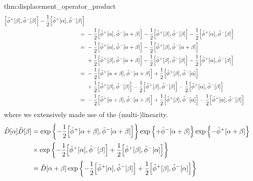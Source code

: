 \begin{delayedproof}{thm:displacement_operator_product}
\begin{equation*}
\begin{split}
			\comm{\hat\phi^+[\beta]}{\hat\phi^-[\beta]}
			-
			\frac{1}{2}
			\comm{\hat\phi^+[\alpha]}{\hat\phi^-[\beta]}
			\\
			=&\
			-
			\frac{1}{2}
			\comm{\hat\phi^+[\alpha]}{\hat\phi^-[\alpha+\beta]}
			-
			\frac{1}{2}
			\comm{\hat\phi^+[\beta]}{\hat\phi^-[\beta]}
			-
			\frac{1}{2}
			\comm{\hat\phi^+[\alpha]}{\hat\phi^-[\beta]}
			\\
			=&\
			-
			\frac{1}{2}
			\comm{\hat\phi^+[\alpha]}{\hat\phi^-[\alpha+\beta]}
			-
			\frac{1}{2}
			\comm{\hat\phi^+[\beta]}{\hat\phi^-[\alpha+\beta]}
			\\
			&\
			+
			\frac{1}{2}
			\comm{\hat\phi^+[\beta]}{\hat\phi^-[\alpha+\beta]}
			-
			\frac{1}{2}
			\comm{\hat\phi^+[\beta]}{\hat\phi^-[\beta]}
			-
			\frac{1}{2}
			\comm{\hat\phi^+[\alpha]}{\hat\phi^-[\beta]}
			\\
			=&\
			-
			\frac{1}{2}
			\comm{\hat\phi^+[\alpha+\beta]}{\hat\phi^-[\alpha+\beta]}
			+
			\frac{1}{2}
			\comm{\hat\phi^+[\beta]}{\hat\phi^-[\alpha]}
			\\
			&\
			+
			\frac{1}{2}
			\comm{\hat\phi^+[\beta]}{\hat\phi^-[\beta]}
			-
			\frac{1}{2}
			\comm{\hat\phi^+[\beta]}{\hat\phi^-[\beta]}
			-
			\frac{1}{2}
			\comm{\hat\phi^+[\alpha]}{\hat\phi^-[\beta]}
			\\
			=&\
			-
			\frac{1}{2}
			\comm{\hat\phi^+[\alpha+\beta]}{\hat\phi^-[\alpha+\beta]}
			+
			\frac{1}{2}
			\comm{\hat\phi^+[\beta]}{\hat\phi^-[\alpha]}
			-
			\frac{1}{2}
			\comm{\hat\phi^+[\alpha]}{\hat\phi^-[\beta]}
		\end{split}
	\end{equation*}
	where we extensively made use of the (multi-)linearity.
	\begin{equation*}
		\begin{split}
			\hat{D}[\alpha]
			\hat{D}[\beta]
			&=
			\exp\left\{
				-
				\frac{1}{2}
				\comm{\hat\phi^+[\alpha+\beta]}{\hat\phi^-[\alpha+\beta]}
			\right\}
			\exp\left\{
				+
				\hat\phi^-[\alpha+\beta]
			\right\}
			\exp\left\{
				-
				\hat\phi^+[\alpha+\beta]
			\right\}
			\\
			&\times
			\exp\left\{
				-
				\frac{1}{2}
				\comm{\hat\phi^+[\alpha]}{\hat\phi^-[\beta]}
				+
				\frac{1}{2}
				\comm{\hat\phi^+[\beta]}{\hat\phi^-[\alpha]}
			\right\}
			\\
			&=
			\hat{D}[\alpha+\beta]
			\exp\left\{
				-
				\frac{1}{2}
				\comm{\hat\phi^+[\alpha]}{\hat\phi^-[\beta]}
				+
				\frac{1}{2}
				\comm{\hat\phi^+[\beta]}{\hat\phi^-[\alpha]}
			\right\}
		\end{split}
	\end{equation*}
\end{delayedproof}
